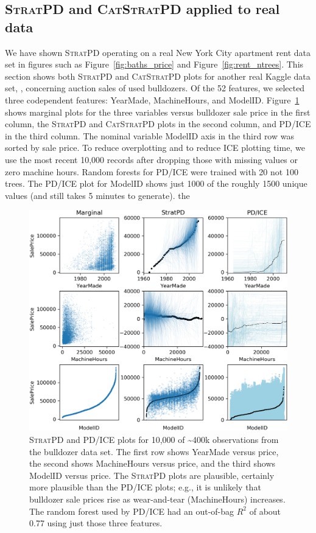 \documentclass[12pt]{article}
\newcommand{\figref}[1]{Figure~\ref{#1}}
\newcommand{\spd}{\fontfamily{cmr}\textsc{\small StratPD}}
\newcommand{\cspd}{\fontfamily{cmr}\textsc{\small CatStratPD}}
\begin{document}
\subsection{\spd{} and \cspd{} applied to real data} 

We have shown \spd{} operating on a real New York City apartment rent data set in figures such as \figref{fig:baths_price} and \figref{fig:rent_ntrees}.  This section shows both \spd{} and \cspd{} plots for another real Kaggle data set, \cite{bulldozer}, concerning auction sales of used bulldozers.  Of the 52 features, we selected three codependent features: YearMade, MachineHours, and ModelID. \figref{fig:bulldozer} shows marginal plots for the three variables versus bulldozer sale price in the first column, the \spd{} and \cspd{} plots in the second column, and PD/ICE in the third column. The nominal variable ModelID axis in the third row was sorted by sale price. To reduce overplotting and to reduce ICE plotting time, we use the most recent 10,000 records after dropping those with missing values or zero machine hours. Random forests for PD/ICE were trained with 20 not 100 trees. The  PD/ICE plot for ModelID shows just 1000 of the roughly 1500 unique values (and still takes 5 minutes to generate).
 the
\begin{figure}[htbp]
\begin{center}
\includegraphics[scale=0.7]{images/bulldozer.png}
\caption{\spd{} and PD/ICE plots for 10,000 of \textasciitilde400k observations from the bulldozer data set. The first row shows YearMade versus price, the second shows MachineHours versus price, and the third shows ModelID versus price. The \spd{} plots are plausible, certainly more plausible than the PD/ICE plots; e.g., it is unlikely that bulldozer sale prices rise as wear-and-tear (MachineHours) increases. The random forest used by PD/ICE had an out-of-bag $R^2$ of about 0.77 using just those three features.}
\label{fig:bulldozer}
\end{center}
\end{figure}
\end{document}
